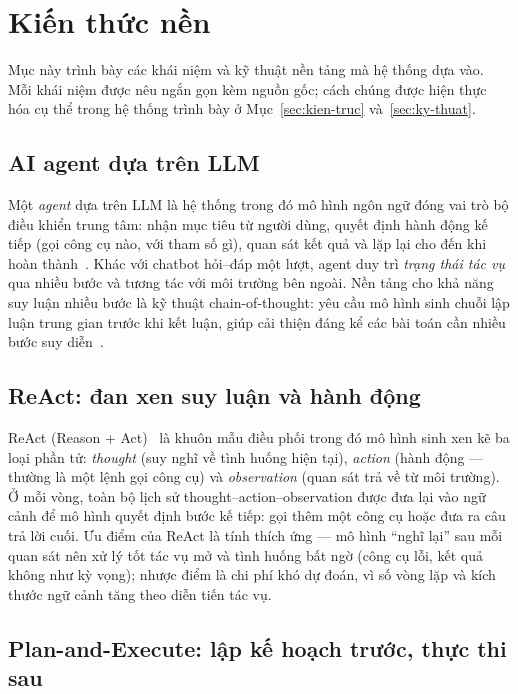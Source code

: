 \section{Kiến thức nền}
\label{sec:kien-thuc-nen}

Mục này trình bày các khái niệm và kỹ thuật nền tảng mà hệ thống dựa vào. Mỗi
khái niệm được nêu ngắn gọn kèm nguồn gốc; cách chúng được hiện thực hóa cụ
thể trong hệ thống trình bày ở Mục~\ref{sec:kien-truc}
và~\ref{sec:ky-thuat}.

\subsection{AI agent dựa trên LLM}

Một \emph{agent} dựa trên LLM là hệ thống trong đó mô hình ngôn ngữ đóng vai
trò bộ điều khiển trung tâm: nhận mục tiêu từ người dùng, quyết định hành động
kế tiếp (gọi công cụ nào, với tham số gì), quan sát kết quả và lặp lại cho đến
khi hoàn thành~\cite{wang2024agentsurvey}. Khác với chatbot hỏi--đáp một lượt,
agent duy trì \emph{trạng thái tác vụ} qua nhiều bước và tương tác với môi
trường bên ngoài. Nền tảng cho khả năng suy luận nhiều bước là kỹ thuật
chain-of-thought: yêu cầu mô hình sinh chuỗi lập luận trung gian trước khi
kết luận, giúp cải thiện đáng kể các bài toán cần nhiều bước
suy diễn~\cite{wei2022cot}.

\subsection{ReAct: đan xen suy luận và hành động}

ReAct (Reason + Act)~\cite{yao2023react} là khuôn mẫu điều phối trong đó mô
hình sinh xen kẽ ba loại phần tử: \emph{thought} (suy nghĩ về tình huống hiện
tại), \emph{action} (hành động --- thường là một lệnh gọi công cụ) và
\emph{observation} (quan sát trả về từ môi trường). Ở mỗi vòng, toàn bộ lịch
sử thought--action--observation được đưa lại vào ngữ cảnh để mô hình quyết
định bước kế tiếp: gọi thêm một công cụ hoặc đưa ra câu trả lời cuối. Ưu điểm
của ReAct là tính thích ứng --- mô hình ``nghĩ lại'' sau mỗi quan sát nên xử
lý tốt tác vụ mở và tình huống bất ngờ (công cụ lỗi, kết quả không như kỳ
vọng); nhược điểm là chi phí khó dự đoán, vì số vòng lặp và kích thước ngữ
cảnh tăng theo diễn tiến tác vụ.

\subsection{Plan-and-Execute: lập kế hoạch trước, thực thi sau}

